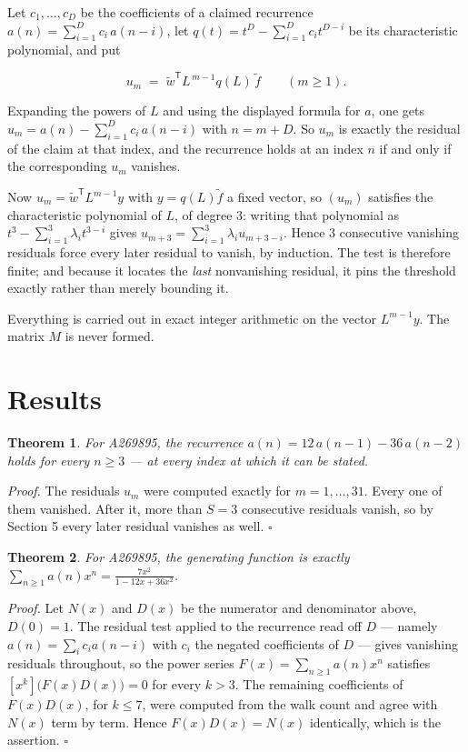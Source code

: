 \documentclass[11pt]{article}
\newtheorem{theorem}{Theorem}
\theoremstyle{definition}
\begin{document}
Let $c_1,\dots,c_D$ be the coefficients of a claimed recurrence $a(n) = \sum_{i=1}^{D} c_i\,a(n-i)$, let $q(t) = t^{D} - \sum_{i=1}^{D} c_i t^{D-i}$ be its characteristic polynomial, and put

\[u_m \;=\; \tilde w^{\mathsf T} L^{\,m-1} q(L)\,\tilde f \qquad (m \ge 1).\]

Expanding the powers of $L$ and using the displayed formula for $a$, one gets $u_m = a(n) - \sum_{i=1}^{D} c_i\,a(n-i)$ with $n = m + D$. So $u_m$ is exactly the residual of the claim at that index, and the recurrence holds at an index $n$ if and only if the corresponding $u_m$ vanishes.

Now $u_m = \tilde w^{\mathsf T} L^{m-1} y$ with $y = q(L)\tilde f$ a fixed vector, so $(u_m)$ satisfies the characteristic polynomial of $L$, of degree $3$: writing that polynomial as $t^{3} - \sum_{i=1}^{3} \lambda_i t^{3-i}$ gives $u_{m+3} = \sum_{i=1}^{3} \lambda_i u_{m+3-i}$. Hence $3$ consecutive vanishing residuals force every later residual to vanish, by induction. The test is therefore finite; and because it locates the {\itshape last} nonvanishing residual, it pins the threshold exactly rather than merely bounding it.

Everything is carried out in exact integer arithmetic on the vector $L^{m-1}y$. The matrix $M$ is never formed.

\section{Results}

\begin{theorem} For A269895, the recurrence $a(n) = 12\,a(n-1) - 36\,a(n-2)$ holds for every $n \ge 3$ --- at every index at which it can be stated.\end{theorem}

{\itshape Proof.} The residuals $u_m$ were computed exactly for $m = 1,\dots,31$. Every one of them vanished. After it, more than $S = 3$ consecutive residuals vanish, so by Section 5 every later residual vanishes as well. $\square$

\begin{theorem} For A269895, the generating function is exactly $\sum_{n\ge 1} a(n)x^n = \frac{7x^{2}}{1 - 12x + 36x^{2}}$.\end{theorem}

{\itshape Proof.} Let $N(x)$ and $D(x)$ be the numerator and denominator above, $D(0)=1$. The residual test applied to the recurrence read off $D$ --- namely $a(n) = \sum_i c_i a(n-i)$ with $c_i$ the negated coefficients of $D$ --- gives vanishing residuals throughout, so the power series $F(x)=\sum_{n\ge 1}a(n)x^n$ satisfies $[x^k]\bigl(F(x)D(x)\bigr) = 0$ for every $k > 3$. The remaining coefficients of $F(x)D(x)$, for $k \le 7$, were computed from the walk count and agree with $N(x)$ term by term. Hence $F(x)D(x) = N(x)$ identically, which is the assertion. $\square$
\end{document}
